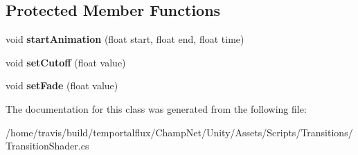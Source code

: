 \subsection*{Protected Member Functions}
\begin{DoxyCompactItemize}
\item 
\hypertarget{class_transition_shader_a583db60d60587c65cf55b74795d744b5}{void {\bfseries start\-Animation} (float start, float end, float time)}\label{class_transition_shader_a583db60d60587c65cf55b74795d744b5}

\item 
\hypertarget{class_transition_shader_a9743abb1f7403614b4b2a861137a4a72}{void {\bfseries set\-Cutoff} (float value)}\label{class_transition_shader_a9743abb1f7403614b4b2a861137a4a72}

\item 
\hypertarget{class_transition_shader_a763066a7f1348a08dc27397a66a240b6}{void {\bfseries set\-Fade} (float value)}\label{class_transition_shader_a763066a7f1348a08dc27397a66a240b6}

\end{DoxyCompactItemize}


The documentation for this class was generated from the following file\-:\begin{DoxyCompactItemize}
\item 
/home/travis/build/temportalflux/\-Champ\-Net/\-Unity/\-Assets/\-Scripts/\-Transitions/Transition\-Shader.\-cs\end{DoxyCompactItemize}
